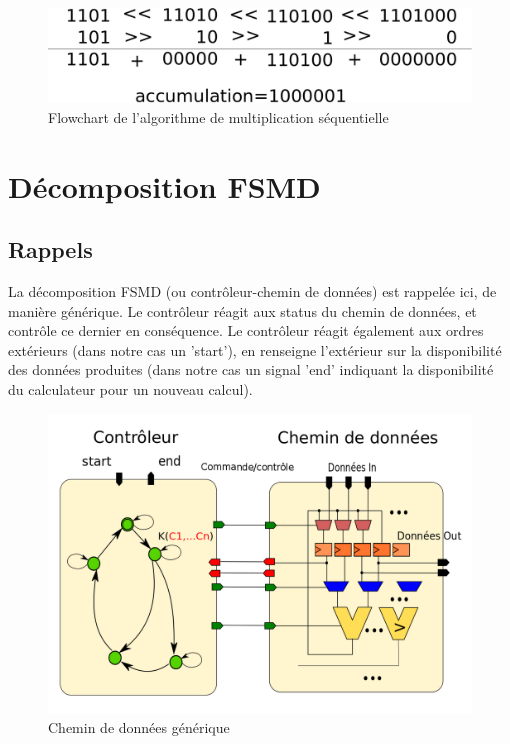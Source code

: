 \documentclass[a4paper,11pt]{article}
\begin{document}
\begin{figure}[!h]
\begin{center}
\includegraphics[scale=0.3]{./figures/algo.png}
\end{center}
\caption{Flowchart de l'algorithme de multiplication séquentielle}
\end{figure}
\FloatBarrier

\section{Décomposition FSMD}

\subsection{Rappels}
La décomposition FSMD (ou contrôleur-chemin de données) est rappelée ici, de manière générique. Le contrôleur réagit aux status du chemin de données, et contrôle ce dernier en conséquence. Le contrôleur réagit également aux ordres extérieurs (dans notre cas un 'start'), en renseigne l'extérieur sur la disponibilité des données produites (dans notre cas un signal 'end' indiquant la disponibilité du calculateur pour un nouveau calcul).

\begin{figure}[!h]
\begin{center}
\includegraphics[scale=0.3]{./figures/FSMD-2.png}
\end{center}
\caption{Chemin de données générique}
\end{figure}
\FloatBarrier
\end{document}
